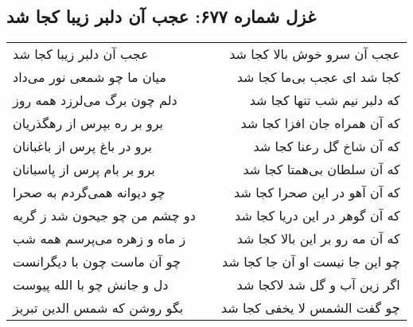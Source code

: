 \begin{center}
\section*{غزل شماره ۶۷۷: عجب آن دلبر زیبا کجا شد}
\label{sec:0677}
\begin{longtable}{l p{0.5cm} r}
عجب آن دلبر زیبا کجا شد
&&
عجب آن سرو خوش بالا کجا شد
\\
میان ما چو شمعی نور می‌داد
&&
کجا شد ای عجب بی‌ما کجا شد
\\
دلم چون برگ می‌لرزد همه روز
&&
که دلبر نیم شب تنها کجا شد
\\
برو بر ره بپرس از رهگذریان
&&
که آن همراه جان افزا کجا شد
\\
برو در باغ پرس از باغبانان
&&
که آن شاخ گل رعنا کجا شد
\\
برو بر بام پرس از پاسبانان
&&
که آن سلطان بی‌همتا کجا شد
\\
چو دیوانه همی‌گردم به صحرا
&&
که آن آهو در این صحرا کجا شد
\\
دو چشم من چو جیحون شد ز گریه
&&
که آن گوهر در این دریا کجا شد
\\
ز ماه و زهره می‌پرسم همه شب
&&
که آن مه رو بر این بالا کجا شد
\\
چو آن ماست چون با دیگرانست
&&
چو این جا نیست او آن جا کجا شد
\\
دل و جانش چو با الله پیوست
&&
اگر زین آب و گل شد لاکجا شد
\\
بگو روشن که شمس الدین تبریز
&&
چو گفت الشمس لا یخفی کجا شد
\\
\end{longtable}
\end{center}
